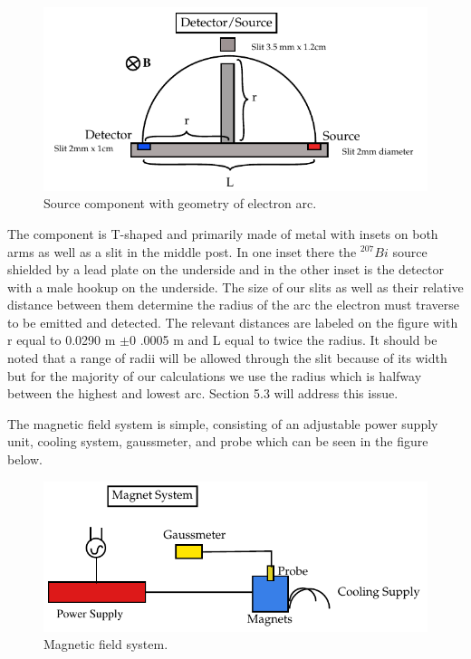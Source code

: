 \begin{figure}[H]
\begin{center}
\includegraphics[width=4 in]{REM-figures2.pdf}
\caption{Source component with geometry of electron arc.}
\end{center}
\end{figure}

The component is T-shaped and primarily made of metal with insets on both arms as well as a slit in the middle post.  In one inset there the $^{207}Bi$ source shielded by a lead plate on the underside and in the other inset is the detector with a male hookup on the underside.  The size of our slits as well as their relative distance between them  determine the radius of the arc the electron must traverse to be emitted and detected. The relevant distances are labeled on the figure with r equal to 0.0290 m $\pm$0 .0005 m and L equal to twice the radius.  It should be noted that a range of radii will be allowed through the slit because of its width but for the majority of our calculations we use the radius which is halfway between the highest and lowest arc. Section 5.3 will address this issue. 

The magnetic field system is simple, consisting of an adjustable power supply unit, cooling system, gaussmeter, and probe which can be seen in the figure below. 

\begin{figure}[H]
\begin{center}
\includegraphics[width=4 in]{REM-figures3.pdf}
\caption{Magnetic field system.}
\end{center}
\end{figure}

